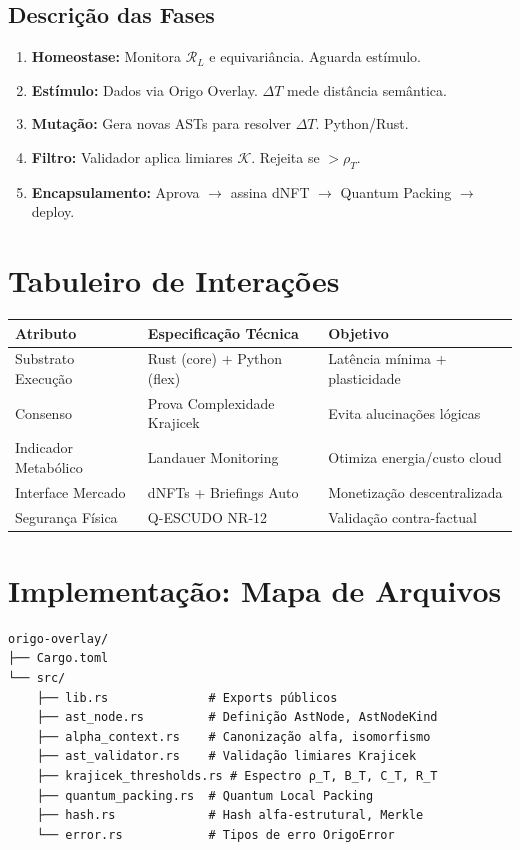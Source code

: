 \documentclass[11pt,a4paper]{article}
\newcommand{\rhoT}{\rho_T}
\newcommand{\DeltaT}{\Delta T}
\newcommand{\RL}{\mathcal{R}_L}
\begin{document}
\subsection{Descrição das Fases}

\begin{enumerate}
    \item \textbf{Homeostase:} Monitora $\RL$ e equivariância. Aguarda estímulo.
    \item \textbf{Estímulo:} Dados via Origo Overlay. $\DeltaT$ mede distância semântica.
    \item \textbf{Mutação:} Gera novas ASTs para resolver $\DeltaT$. Python/Rust.
    \item \textbf{Filtro:} Validador aplica limiares $\mathcal{K}$. Rejeita se $> \rhoT$.
    \item \textbf{Encapsulamento:} Aprova $\to$ assina dNFT $\to$ Quantum Packing $\to$ deploy.
\end{enumerate}

\section{Tabuleiro de Interações}

\begin{center}
\begin{tabular}{@{}lll@{}}
\toprule
\textbf{Atributo} & \textbf{Especificação Técnica} & \textbf{Objetivo} \\
\midrule
Substrato Execução & Rust (core) + Python (flex) & Latência mínima + plasticidade \\
Consenso & Prova Complexidade Krajicek & Evita alucinações lógicas \\
Indicador Metabólico & Landauer Monitoring & Otimiza energia/custo cloud \\
Interface Mercado & dNFTs + Briefings Auto & Monetização descentralizada \\
Segurança Física & Q-ESCUDO NR-12 & Validação contra-factual \\
\bottomrule
\end{tabular}
\end{center}

\section{Implementação: Mapa de Arquivos}

\begin{lstlisting}[caption=Estrutura do Crate Rust origo-overlay]
origo-overlay/
├── Cargo.toml
└── src/
    ├── lib.rs              # Exports públicos
    ├── ast_node.rs         # Definição AstNode, AstNodeKind
    ├── alpha_context.rs    # Canonização alfa, isomorfismo
    ├── ast_validator.rs    # Validação limiares Krajicek
    ├── krajicek_thresholds.rs # Espectro ρ_T, B_T, C_T, R_T
    ├── quantum_packing.rs  # Quantum Local Packing
    ├── hash.rs             # Hash alfa-estrutural, Merkle
    └── error.rs            # Tipos de erro OrigoError
\end{lstlisting}
\end{document}
